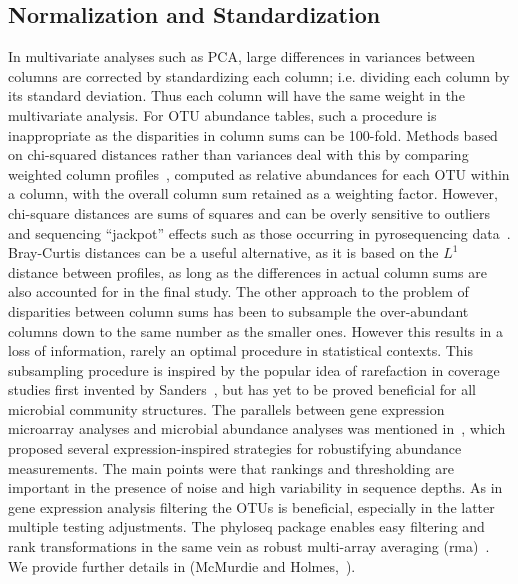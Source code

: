 \documentclass[10pt]{article}\usepackage{graphicx, color}
\begin{document}
\FloatBarrier

\subsection*{Normalization and Standardization}
In multivariate analyses such as PCA, 
large differences in variances between columns are corrected
by standardizing each column; 
i.e. dividing each column by its standard deviation.
Thus each column will have the same weight in the multivariate analysis.
For OTU abundance tables, such a procedure is inappropriate
as the disparities in column sums can be 100-fold.
Methods based on chi-squared distances 
rather than variances deal with this
by comparing weighted column profiles~\cite{greenacre2007},
computed as relative abundances
for each OTU within a column, with the overall column sum
retained as a weighting factor. 
However, chi-square distances are sums of squares 
and can be overly sensitive
to outliers and sequencing ``jackpot'' effects
such as those occurring in pyrosequencing data~\cite{Pinto:2012bk}.
Bray-Curtis distances can be a useful alternative, 
as it is based on the $L^1$ distance between profiles,
as long as the differences in actual column sums 
are also accounted for in the final study.
The other approach to the problem
of disparities between column sums
has been to subsample the over-abundant columns
down to the same number as the smaller ones.
However this results in a loss of information,
rarely an optimal procedure in statistical contexts.
This subsampling procedure is inspired by the popular idea of rarefaction 
in coverage studies first invented by Sanders~\cite{Sanders:1968},
but has yet to be proved beneficial for all microbial community structures.
The parallels between gene expression microarray analyses
and microbial abundance analyses
was mentioned in~\cite{Holmes:2011vb},
which proposed several expression-inspired strategies 
for robustifying abundance measurements.
The main points were that rankings and thresholding are important
in the presence of noise and high variability in sequence depths.
As in gene expression analysis filtering the OTUs is beneficial,
especially in the latter multiple testing adjustments.
The phyloseq package enables easy filtering and rank transformations
in the same vein as robust multi-array averaging (rma)~\cite{Allison:2006fk}.
We provide further details in (McMurdie and Holmes,~\cite{holmes:pnas:ch7}).

\FloatBarrier
\end{document}
